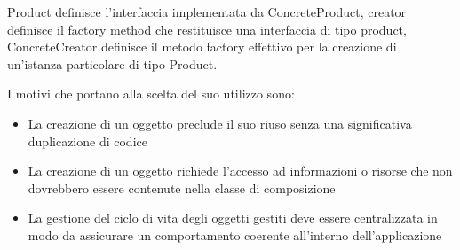 Product definisce l'interfaccia implementata da ConcreteProduct,
creator definisce il factory method che restituisce una interfaccia di
tipo product, ConcreteCreator definisce il metodo factory effettivo
per la creazione di un’istanza particolare di tipo Product. 


I motivi che portano alla scelta del suo utilizzo sono:

\begin{itemize}
\item La creazione di un oggetto preclude il suo riuso senza una significativa duplicazione di codice
\item  La creazione di un oggetto richiede l'accesso ad informazioni o risorse che non dovrebbero essere contenute nella classe di composizione
\item La gestione del ciclo di vita degli oggetti gestiti deve essere centralizzata in modo da assicurare un comportamento coerente all'interno dell'applicazione

\end{itemize}

























